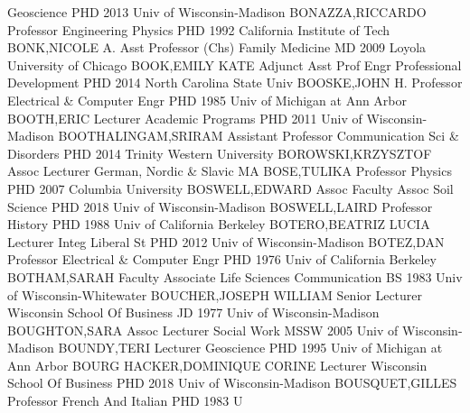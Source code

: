 \documentclass[
]{article}
\begin{document}
 \textbar Geoscience \textbar PHD 2013 Univ of
Wisconsin-Madison \textbar BONAZZA,RICCARDO \textbar Professor
\textbar{}  \textbar Engineering Physics \textbar PHD 1992
California Institute of Tech \textbar BONK,NICOLE A. \textbar Asst
Professor (Chs) \textbar{}  \textbar Family Medicine
\textbar MD 2009 Loyola University of Chicago \textbar BOOK,EMILY KATE
\textbar Adjunct Asst Prof \textbar{}  \textbar Engr
Professional Development \textbar PHD 2014 North Carolina State Univ
\textbar BOOSKE,JOHN H. \textbar Professor \textbar{} 
\textbar Electrical \& Computer Engr \textbar PHD 1985 Univ of Michigan
at Ann Arbor \textbar BOOTH,ERIC \textbar Lecturer \textbar{}
 \textbar Academic Programs \textbar PHD 2011 Univ of
Wisconsin-Madison \textbar BOOTHALINGAM,SRIRAM \textbar Assistant
Professor \textbar{}  \textbar Communication Sci \& Disorders
\textbar PHD 2014 Trinity Western University \textbar BOROWSKI,KRZYSZTOF
\textbar Assoc Lecturer \textbar{}  \textbar German, Nordic
\& Slavic \textbar MA \textbar BOSE,TULIKA \textbar Professor \textbar{}
 \textbar Physics \textbar PHD 2007 Columbia University
\textbar BOSWELL,EDWARD \textbar Assoc Faculty Assoc \textbar{}
 \textbar Soil Science \textbar PHD 2018 Univ of
Wisconsin-Madison \textbar BOSWELL,LAIRD \textbar Professor \textbar{}
 \textbar History \textbar PHD 1988 Univ of California
Berkeley \textbar BOTERO,BEATRIZ LUCIA \textbar Lecturer \textbar{}
 \textbar Integ Liberal St \textbar PHD 2012 Univ of
Wisconsin-Madison \textbar BOTEZ,DAN \textbar Professor \textbar{}
 \textbar Electrical \& Computer Engr \textbar PHD 1976 Univ
of California Berkeley \textbar BOTHAM,SARAH \textbar Faculty Associate
\textbar{}  \textbar Life Sciences Communication \textbar BS
1983 Univ of Wisconsin-Whitewater \textbar BOUCHER,JOSEPH WILLIAM
\textbar Senior Lecturer \textbar{}  \textbar Wisconsin
School Of Business \textbar JD 1977 Univ of Wisconsin-Madison
\textbar BOUGHTON,SARA \textbar Assoc Lecturer \textbar{} 
\textbar Social Work \textbar MSSW 2005 Univ of Wisconsin-Madison
\textbar BOUNDY,TERI \textbar Lecturer \textbar{} 
\textbar Geoscience \textbar PHD 1995 Univ of Michigan at Ann Arbor
\textbar BOURG HACKER,DOMINIQUE CORINE \textbar Lecturer \textbar{}
 \textbar Wisconsin School Of Business \textbar PHD 2018 Univ
of Wisconsin-Madison \textbar BOUSQUET,GILLES \textbar Professor
\textbar{}  \textbar French And Italian \textbar PHD 1983 U
\end{document}
